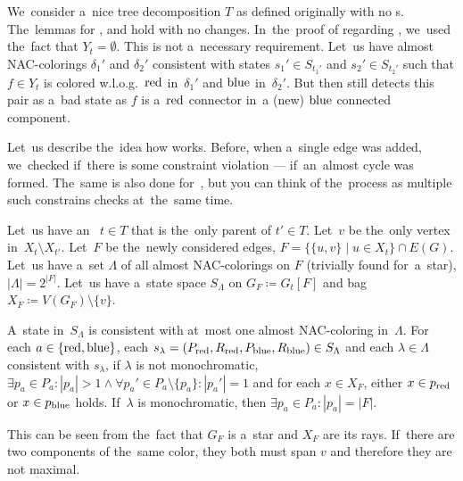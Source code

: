 We~consider a~nice tree decomposition \( T \) as defined originally
with no \IntroduceEdgeNode{}s.
The~lemmas for
\LeafNode{}, \RootNode{} and \ForgetVertexNode{} hold with no changes.
%
In~the~proof of 
regarding \JoinNode{},
we~used the~fact that \( Y_t = \emptyset \).
This is not a~necessary requirement.
%
Let~us have almost NAC-colorings \( \delta_1' \) and \( \delta_2' \)
consistent with states \( s_1' \in S_{t_1'} \) and \( s_2' \in S_{t_2'} \)
such that \( f \in Y_t \) is colored w.l.o.g.\ \( \text{red} \) in~\( \delta_1' \)
and \( \text{blue} \) in~\( \delta_2' \).
But then 
still detects this pair as a~bad state
as \( f \) is a~\( \text{red} \) connector in~a (new) \( \text{blue} \) connected component.

Let~us describe the~idea how \IntroduceVertexWithEdgesNode{} works.
Before, when a~single edge was added,
we~checked if~there is some constraint violation
--- if~an~almost cycle was formed.
The~same is also done for~\IntroduceVertexWithEdgesNode{},
but you can think of the~process as
multiple such constrains checks at~the~same time.

Let~us have an~\IntroduceVertexWithEdgesNode{} \( t \in T \) that
is the~only parent of \( t' \in T \).
Let~\( v \) be the~only vertex in~\( X_t \setminus X_{t'} \).
Let~\( F \) be the~newly considered edges,
\( F = \{ \{ u, v \} \mid u \in X_t \} \cap E(G) \).
%
Let~us have a~set \( \Lambda \) of all almost NAC-colorings on \( F \)
(trivially found for~a~star), \( |\Lambda| = 2^{|F|} \).
Let~us have a~state space \( S_\Lambda \) on \( G_F \coloneqq G_t[F] \)
and bag \( X_F \coloneqq V(G_F) \setminus \{ v \} \).
%
\begin{observation}
	A~state in~\( S_\Lambda \) is consistent with at~most one
	almost NAC-coloring in~\( \Lambda \).
	For each \( a \in \{\text{red}, \text{blue}\} \), each
	\( s_\lambda = (P_{\text{red}}, R_{\text{red}}, P_{\text{blue}}, R_{\text{blue}}) \in S_\Lambda \)
	and each \( \lambda \in \Lambda \) consistent with \( s_\lambda \),
	if \( \lambda \) is not monochromatic,
	\( {\exists p_a \in P_a} : {|p_a| > 1
	\land \forall p_a' \in P_a \setminus \{p_a\} : |p_a'| = 1} \)
	and for each \( x \in X_F \), either \( x \in p_{\text{red}} \) or \( x \in p_{\text{blue}} \) holds.
	If~\( \lambda \) is monochromatic, then \( {\exists p_a \in P_a} : {|p_a| = |F|} \).
\end{observation}
%
This can be seen from the~fact that \( G_F \) is a~star and \( X_F \) are its rays.
If~there are two components of the~same color,
they both must span \( v \)
and therefore they are not maximal.

